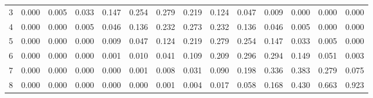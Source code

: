 \documentclass[
]{article}
\begin{document}
\begin{longtable}[t]{lrrrrrrrrrrrrr}
\hspace{1em}3 & 0.000 & 0.005 & 0.033 & 0.147 & 0.254 & 0.279 & 0.219 & 0.124 & 0.047 & 0.009 & 0.000 & 0.000 & 0.000\\
\hspace{1em}4 & 0.000 & 0.000 & 0.005 & 0.046 & 0.136 & 0.232 & 0.273 & 0.232 & 0.136 & 0.046 & 0.005 & 0.000 & 0.000\\
\hspace{1em}5 & 0.000 & 0.000 & 0.000 & 0.009 & 0.047 & 0.124 & 0.219 & 0.279 & 0.254 & 0.147 & 0.033 & 0.005 & 0.000\\
\hspace{1em}6 & 0.000 & 0.000 & 0.000 & 0.001 & 0.010 & 0.041 & 0.109 & 0.209 & 0.296 & 0.294 & 0.149 & 0.051 & 0.003\\
\hspace{1em}7 & 0.000 & 0.000 & 0.000 & 0.000 & 0.001 & 0.008 & 0.031 & 0.090 & 0.198 & 0.336 & 0.383 & 0.279 & 0.075\\
\hspace{1em}8 & 0.000 & 0.000 & 0.000 & 0.000 & 0.000 & 0.001 & 0.004 & 0.017 & 0.058 & 0.168 & 0.430 & 0.663 & 0.923\\
\bottomrule
\end{longtable}
\end{document}
